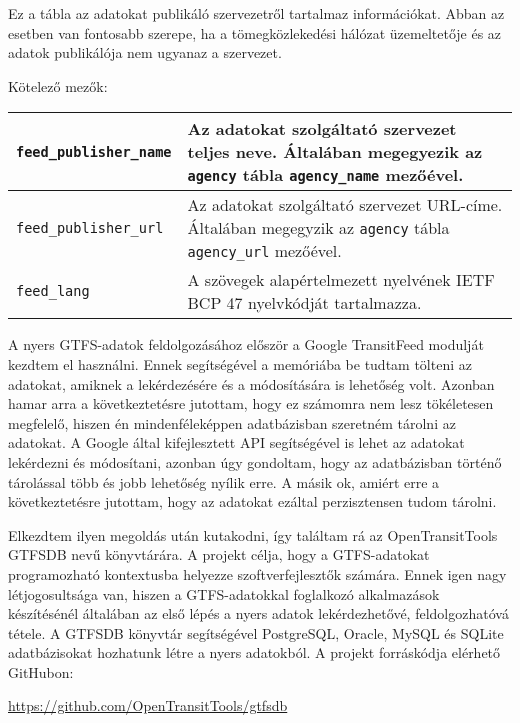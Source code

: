 
Ez a tábla az adatokat publikáló szervezetről tartalmaz információkat. Abban az esetben van fontosabb szerepe, ha a tömegközlekedési hálózat üzemeltetője és az adatok publikálója nem ugyanaz a szervezet.

\medskip

\noindent Kötelező mezők:

\bigskip

\begin{tabular}{|p{4.5cm}|p{8.5cm}|}
\hline
\texttt{feed\_publisher\_name} & Az adatokat szolgáltató szervezet teljes neve. Általában megegyezik az \texttt{agency} tábla \texttt{agency\_name} mezőével. \\
\hline
\texttt{feed\_publisher\_url} & Az adatokat szolgáltató szervezet URL-címe. Általában megegyzik az \texttt{agency} tábla \texttt{agency\_url} mezőével. \\
\hline
\texttt{feed\_lang} & A szövegek alapértelmezett nyelvének IETF BCP 47 nyelvkódját tartalmazza. \\
\hline
\end{tabular}


A nyers GTFS-adatok feldolgozásához először a Google TransitFeed modulját kezdtem el használni. Ennek segítségével a memóriába be tudtam tölteni az adatokat, amiknek a lekérdezésére és a módosítására is lehetőség volt. Azonban hamar arra a következtetésre jutottam, hogy ez számomra nem lesz tökéletesen megfelelő, hiszen én mindenféleképpen adatbázisban szeretném tárolni az adatokat. A Google által kifejlesztett API segítségével is lehet az adatokat lekérdezni és módosítani, azonban úgy gondoltam, hogy az adatbázisban történő tárolással több és jobb lehetőség nyílik erre. A másik ok, amiért erre a következtetésre jutottam, hogy az adatokat ezáltal perzisztensen tudom tárolni.

Elkezdtem ilyen megoldás után kutakodni, így találtam rá az OpenTransitTools GTFSDB nevű könyvtárára. A projekt célja, hogy a GTFS-adatokat programozható kontextusba helyezze szoftverfejlesztők számára. Ennek igen nagy létjogosultsága van, hiszen a GTFS-adatokkal foglalkozó alkalmazások készítésénél általában az első lépés a nyers adatok lekérdezhetővé, feldolgozhatóvá tétele. A GTFSDB könyvtár segítségével PostgreSQL, Oracle, MySQL és SQLite adatbázisokat hozhatunk létre a nyers adatokból. A projekt forráskódja elérhető GitHubon:

\begin{center}
\url{https://github.com/OpenTransitTools/gtfsdb}
\end{center}

